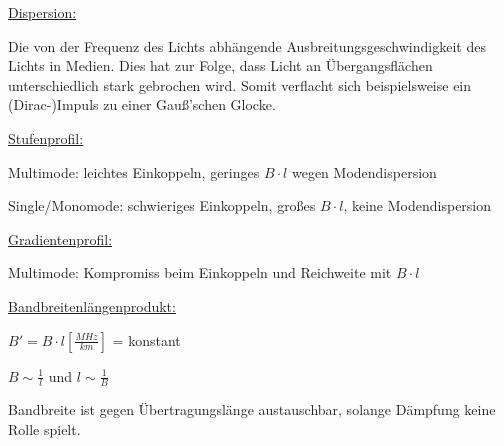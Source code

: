 \begin{description}
    \item \underline{Dispersion:}

          {\small Die von der Frequenz des Lichts abhängende
              Ausbreitungsgeschwindigkeit des Lichts in Medien. Dies hat zur Folge,
              dass Licht an Übergangsflächen unterschiedlich stark gebrochen wird.
              Somit verflacht sich beispielsweise ein (Dirac-)Impuls zu einer Gauß'schen
              Glocke.
          }
    \item \underline{Stufenprofil:}

          {\small Multimode: leichtes Einkoppeln, geringes $B\cdot l$ wegen
              Modendispersion

              Single/Monomode: schwieriges Einkoppeln, großes $B\cdot l$, keine
              Modendispersion
          }
    \item \underline{Gradientenprofil:}

          {\small Multimode: Kompromiss beim Einkoppeln und Reichweite mit $B\cdot l$}
    \item \underline{Bandbreitenlängenprodukt:}

          {\small $B' =  B\cdot l[\frac{MHz}{km}]$ = konstant

              $B \sim \frac{1}{l}$ und $l\sim \frac{1}{B}$

              Bandbreite ist gegen Übertragungslänge austauschbar, solange
              Dämpfung keine Rolle spielt.
          }
\end{description}

